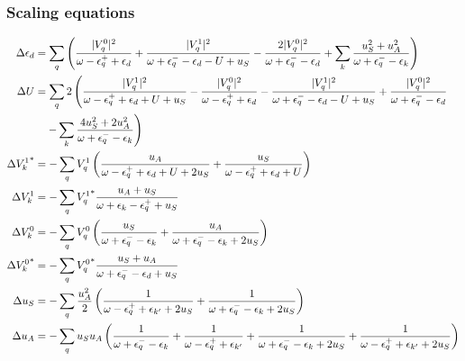 \documentclass[14pt]{extarticle}
\numberwithin{equation}{section}
\begin{document}
{{\subsubsection{Scaling equations}
\begin{align*}
	\Delta \epsilon_d &= \sum_q \left({\frac{|V_q^0|^2}{\omega - \epsilon_q^+ + \epsilon_d } + \frac{|V_q^1|^2}{\omega + \epsilon^-_q - \epsilon_d  - U + u_S} - \frac{2|V_q^0|^2}{\omega + \epsilon^-_q - \epsilon_d} + \sum_k\frac{u_S^2 + u_A^2}{\omega + \epsilon_q^- - \epsilon_k}}\right)\\
	\Delta U &= \sum_q 2\left(\frac{|V_q^1|^2}{\omega - \epsilon_q^+ + \epsilon_d + U + u_S} - \frac{|V_q^0|^2}{\omega - \epsilon_q^+ + \epsilon_d} - \frac{|V_q^1|^2}{\omega + \epsilon^-_q - \epsilon_d  - U + u_S} +\frac{|V_q^0|^2}{\omega + \epsilon^-_q - \epsilon_d} \right.\\
		 &\quad\left.-\sum_k \frac{4u_S^2 + 2u_A^2}{\omega + \epsilon_q^- - \epsilon_k}\right)\\
	\Delta {V_k^1}^* &=-\sum_q V_q^1\left({\frac{u_A}{\omega - \epsilon_q^+ + \epsilon_d + U + 2u_S} + \frac{u_S}{\omega - \epsilon_q^+ + \epsilon_d + U}}\right) \\
\Delta {V_k^1} &= -\sum_q  {V_q^1}^*\frac{u_A + u_S}{\omega + \epsilon_k - \epsilon_q^+ + u_S}\\
\Delta V_k^0 &= -\sum_q V_q^0\left({\frac{u_S}{\omega + \epsilon_q^- - \epsilon_{k}} + \frac{u_A}{\omega + \epsilon_q^- - \epsilon_{k} + 2u_S}}\right)\\
\Delta {V_k^0}^* &=-\sum_q {V_q^0}^* \frac{u_S + u_A}{\omega + \epsilon_q^- - \epsilon_d + u_S}\\
\Delta u_S &= -\sum_q \frac{u_A^2}{2}\left({\frac{1}{\omega - \epsilon_q^+ + \epsilon_{k^\prime}+2u_S} + \frac{1}{\omega + \epsilon_q^- - \epsilon_k + 2u_S}}\right)\\
\Delta u_A &= - \sum_q u_S u_A \left({\frac{1}{\omega + \epsilon_q^-  - \epsilon_{k}} + \frac{1}{\omega - \epsilon_q^+  + \epsilon_{k^\prime}} + \frac{1}{\omega + \epsilon_q^-  - \epsilon_{k} + 2u_S} + \frac{1}{\omega - \epsilon_q^+  + \epsilon_{k^\prime} + 2u_S}}\right)
\end{align*}
}}
\end{document}
